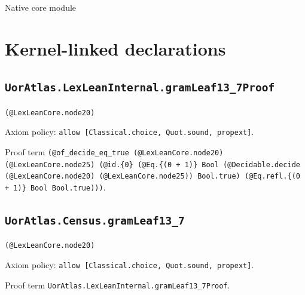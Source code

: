 \documentclass[11pt]{article}
\begin{document}
\begin{center}{\LARGE Native core module}\end{center}
\section*{Kernel-linked declarations}
\subsection*{\texttt{UorAtlas.LexLeanInternal.gramLeaf13\_7Proof}}
\noindent\texttt{(@LexLeanCore.node20)}\par
\noindent Axiom policy: \texttt{allow [Classical.choice, Quot.sound, propext]}.\par
\noindent Proof term \texttt{(@of\_decide\_eq\_true (@LexLeanCore.node20) (@LexLeanCore.node25) (@id.\{0\} (@Eq.\{(0 + 1)\} Bool (@Decidable.decide (@LexLeanCore.node20) (@LexLeanCore.node25)) Bool.true) (@Eq.refl.\{(0 + 1)\} Bool Bool.true)))}.\par
\subsection*{\texttt{UorAtlas.Census.gramLeaf13\_7}}
\noindent\texttt{(@LexLeanCore.node20)}\par
\noindent Axiom policy: \texttt{allow [Classical.choice, Quot.sound, propext]}.\par
\noindent Proof term \texttt{UorAtlas.LexLeanInternal.gramLeaf13\_7Proof}.\par
\end{document}

